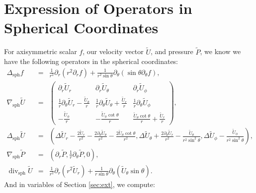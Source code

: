 \documentclass[11pt,a4paper]{article}
\numberwithin{equation}{section}
\newcommand{\tmop}[1]{\ensuremath{\operatorname{#1}}}
\begin{document}
\section{Expression of Operators in Spherical
Coordinates}\label{sec sphdel}
For axisymmetric scalar $f$, our velocity vector $\widetilde{U}$, and pressure $\widetilde{P}$, we know we have the following operators in the spherical coordinates:
\label{sec:ops}
\begin{eqnarray*}
\Delta_{\tmop{sph}} f & = & \frac{1}{r^2} \partial_r  (r^2 
  \partial_r f) + \frac{1}{r^2 \sin \theta} \partial_{\theta} 
  (\sin \theta\partial_{\theta}f ) ,\\
  \nabla_{\tmop{sph}}  \widetilde{U} & = & \left(\begin{array}{ccc}
    \partial_r  \widetilde{U}_r & \partial_r  \widetilde{U}_{\theta} & \partial_r 
    \widetilde{U}_{\phi}\\
    \frac{1}{r} \partial_{\theta}  \widetilde{U}_r - \frac{\widetilde{U}_{\theta}}{r}
    & \frac{1}{r} \partial_{\theta}  \widetilde{U}_{\theta} +
    \frac{\widetilde{U}_r}{r} & \frac{1}{r} \partial_{\theta}  \widetilde{U}_{\phi}\\
    - \frac{\widetilde{U}_{\phi}}{r} & - \frac{\widetilde{U}_{\phi} \cot \theta}{r} &
    \frac{\widetilde{U}_{\theta} \cot \theta}{r} + \frac{\widetilde{U}_r}{r}
  \end{array}\right),\\
  \Delta_{\tmop{sph}} \widetilde{U} & = & \left( \Delta \widetilde{U}_r - \frac{2
  \widetilde{U}_r}{r^2} - \frac{2 \partial_{\theta}  \widetilde{U}_{\theta}}{r^2} -
  \frac{2 \widetilde{U}_{\theta} \cot \theta}{r^2}, \Delta \widetilde{U}_{\theta} +
  \frac{2 \partial_{\theta}  \widetilde{U}_r}{r^2} - \frac{\widetilde{U}_{\theta}}{r^2
  \sin^2 \theta}, \Delta \widetilde{U}_{\phi} - \frac{\widetilde{U}_{\phi}}{r^2 \sin^2
  \theta} \right),\\
  \nabla_{\tmop{sph}} \widetilde{P} & = & \left( \partial_r \widetilde{P}, \frac{1}{r}
  \partial_{\theta} \widetilde{P}, 0 \right),\\
  \tmop{div}_{\tmop{sph}}  \widetilde{U} & = & \frac{1}{r^2} \partial_r  (r^2 
  \widetilde{U}_r) + \frac{1}{r \sin \theta} \partial_{\theta} 
  (\widetilde{U}_{\theta} \sin \theta) .
\end{eqnarray*}
And in variables of Section \ref{sec:ext}, we compute: 
\end{document}
